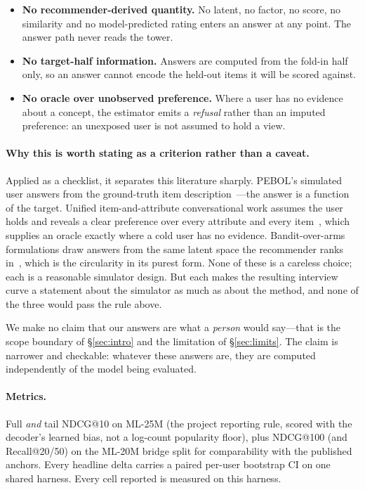 \documentclass[11pt]{article}
\begin{document}
\begin{itemize}[leftmargin=1.4em,itemsep=2pt]
  \item \textbf{No recommender-derived quantity.} No latent, no factor, no score, no similarity and no
        model-predicted rating enters an answer at any point. The answer path never reads the tower.
  \item \textbf{No target-half information.} Answers are computed from the fold-in half only, so an answer cannot
        encode the held-out items it will be scored against.
  \item \textbf{No oracle over unobserved preference.} Where a user has no evidence about a concept, the estimator
        emits a \emph{refusal} rather than an imputed preference: an unexposed user is not assumed to hold a view.
\end{itemize}

\paragraph{Why this is worth stating as a criterion rather than a caveat.} Applied as a checklist, it separates
this literature sharply. PEBOL's simulated user answers from the ground-truth item
description~\cite{austin2024bayesian}---the answer is a function of the target. Unified item-and-attribute
conversational work assumes the user holds and reveals a clear preference over every attribute and every
item~\cite{deng2021unicorn}, which supplies an oracle exactly where a cold user has no evidence. Bandit-over-arms
formulations draw answers from the same latent space the recommender ranks in~\cite{li2021seamlessly}, which is
the circularity in its purest form. None of these is a careless choice; each is a reasonable simulator design. But
each makes the resulting interview curve a statement about the simulator as much as about the method, and none of
the three would pass the rule above.

We make no claim that our answers are what a \emph{person} would say---that is the scope boundary of
\S\ref{sec:intro} and the limitation of \S\ref{sec:limits}. The claim is narrower and checkable: whatever these
answers are, they are computed independently of the model being evaluated.

\paragraph{Metrics.}
Full \emph{and} tail NDCG@10 on ML-25M (the project reporting rule, scored with the decoder's learned bias, not a
log-count popularity floor), plus NDCG@100 (and Recall@20/50) on the ML-20M bridge split for comparability with the
published anchors. Every headline delta carries a paired per-user bootstrap CI on one shared harness. Every cell reported is measured on this harness.
\end{document}
